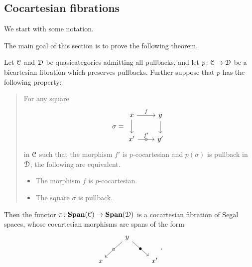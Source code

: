 \documentclass[main.tex]{subfiles}
\begin{document}
\subsection{Cocartesian fibrations}
\label{ssc:cocartesian_fibrations}

We start with some notation.

The main goal of this section is to prove the following theorem.

\begin{theorem}
  \label{thm:span_of_bicartesian_fibration_is_bicartesian_fibration}
  Let $\mathcal{C}$ and $\mathcal{D}$ be quasicategories admitting all pullbacks, and let $p\colon \mathcal{C} \to \mathcal{D}$ be a bicartesian fibration which preserves pullbacks. Further suppose that $p$ has the following property:

  \begin{quote}
    For any square
    \begin{equation*}
      \sigma =
      \begin{tikzcd}
        x
        \arrow[r, "f"]
        \arrow[d]
        & y
        \arrow[d]
        \\
        x'
        \arrow[r, "f'", "\circ" marking]
        & y'
      \end{tikzcd}
    \end{equation*}
    in $\mathcal{C}$ such that the morphism $f'$ is $p$-cocartesian and $p(\sigma)$ is pullback in $\mathcal{D}$, the following are equivalent.
    \begin{itemize}
      \item The morphism $f$ is $p$-cocartesian.

      \item The square $\sigma$ is pullback.
    \end{itemize}
  \end{quote}

  Then the functor $\pi\colon \mathbf{Span}(\mathcal{C}) \to \mathbf{Span}(\mathcal{D})$ is a cocartesian fibration of Segal spaces, whose cocartesian morphisms are spans of the form
  \begin{equation*}
    \begin{tikzcd}
      & y
      \arrow[dl, "\circ" marking]
      \arrow[dr, "\bullet" marking]
      \\
      x
      && x'
    \end{tikzcd}.
  \end{equation*}
\end{theorem}
\end{document}
